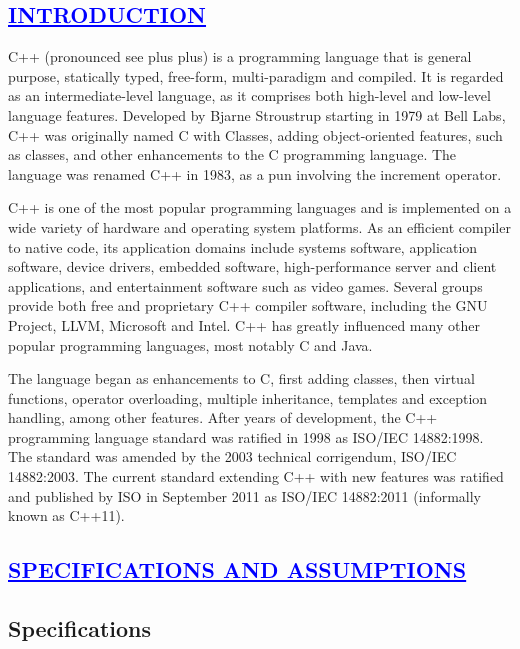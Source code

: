 \documentclass[a4paper,12pt]{report}
\begin{document}
\begin{enumerate}
\begin{center}
\chapter{\textcolor{blue}{\underline {INTRODUCTION}}}
\end{center}
\noindent C++ (pronounced see plus plus) is a programming language that is general purpose, statically typed, free-form, multi-paradigm and compiled. It is regarded as an intermediate-level language, as it comprises both high-level and low-level language features. Developed by Bjarne Stroustrup starting in 1979 at Bell Labs, C++ was originally named C with Classes, adding object-oriented features, such as classes, and other enhancements to the C programming language. The language was renamed C++ in 1983, as a pun involving the increment operator.

C++ is one of the most popular programming languages and is implemented on a wide variety of hardware and operating system platforms. As an efficient compiler to native code, its application domains include systems software, application software, device drivers, embedded software, high-performance server and client applications, and entertainment software such as video games. Several groups provide both free and proprietary C++ compiler software, including the GNU Project, LLVM, Microsoft and Intel. C++ has greatly influenced many other popular programming languages, most notably C and Java.

The language began as enhancements to C, first adding classes, then virtual functions, operator overloading, multiple inheritance, templates and exception handling, among other features. After years of development, the C++ programming language standard was ratified in 1998 as ISO/IEC 14882:1998. The standard was amended by the 2003 technical corrigendum, ISO/IEC 14882:2003. The current standard extending C++ with new features was ratified and published by ISO in September 2011 as ISO/IEC 14882:2011 (informally known as C++11).

\begin{center}
\chapter{\textcolor{blue}{\underline {SPECIFICATIONS AND ASSUMPTIONS}}}
\end{center}
\section*{Specifications}


\end{enumerate}
\end{document}
